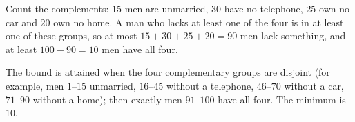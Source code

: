 Count the complements: $15$ men are unmarried, $30$ have no telephone, $25$ own no car and $20$ own no home. A man who lacks at least one of the four is in at least one of these groups, so at most $15+30+25+20=90$ men lack something, and at least $100-90=10$ men have all four.

The bound is attained when the four complementary groups are disjoint (for example, men $1$--$15$ unmarried, $16$--$45$ without a telephone, $46$--$70$ without a car, $71$--$90$ without a home); then exactly men $91$--$100$ have all four. The minimum is $\boxed{10}$.
